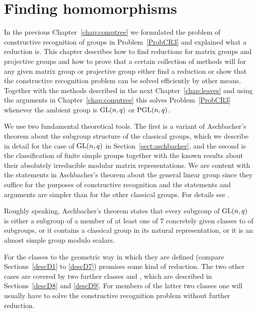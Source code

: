 
\chapter{Finding homomorphisms}
\label{chap:findhom}
%
%

In the previous Chapter~\ref{chap:comptree} we formulated the problem
of constructive recognition of groups in Problem~\ref{ProbCR3} and 
explained what a reduction is. This chapter describes how to find
reductions for matrix groups and projective groups and how to prove
that a certain collection of methods will for any given
matrix group or projective group either find a reduction
or show that the constructive 
recognition problem can be solved efficiently by other means. Together
with the methods described in the next Chapter~\ref{chap:leaves}
and using the 
arguments in Chapter~\ref{chap:comptree} this solves
Problem~\ref{ProbCR3} whenever the ambient group is $\GL(n,q)$ or
$\PGL(n,q)$.

We use two fundamental theoretical tools. The first is a variant of
Aschbacher's theorem
about the subgroup structure of the classical groups, which we describe
in detail for the case of $\GL(n,q)$ in Section~\ref{sect:aschbacher},
and the second is the classification of finite simple groups together
with the known results about their absolutely irreducible modular matrix
representations. We are
content with the statements in Aschbacher's theorem about the general
linear group since they suffice for the purposes of constructive
recognition and the statements and arguments are simpler
than for the other classical groups. For details see \cite{aschbacher}.

Roughly speaking, Aschbacher's theorem states that every subgroup of $\GL(n,q)$
is either a subgroup of a member of at least one of $7$ concretely given
classes  to  of subgroups, or it contains a classical group
in its natural representation, or it is an almost simple group modulo
scalars.

For the classes  to  the geometric way in which they are defined
(compare
Sections~\ref{descD1} to \ref{descD7}) promises some kind of
reduction. The two other cases are covered by two further classes 
and , which are described in Sections~\ref{descD8} and \ref{descD9}.
For members of the latter two classes one will usually have to solve the
constructive recognition problem without further reduction.

